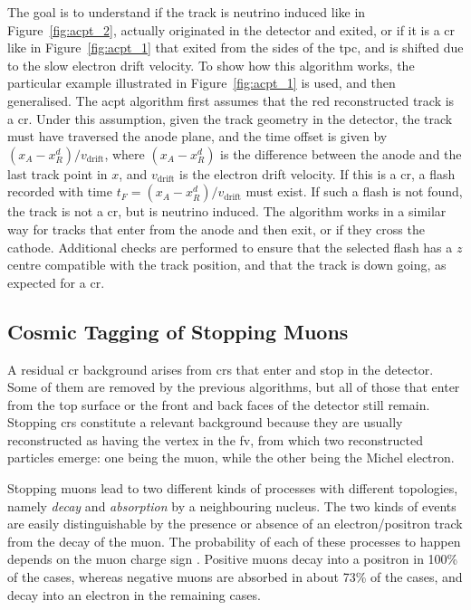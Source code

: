 The goal is to understand if the track is neutrino induced like in Figure~\ref{fig:acpt_2}, actually originated in the detector and exited, or if it is a \acrshort{cr} like in Figure~\ref{fig:acpt_1} that exited from the sides of the \acrshort{tpc}, and is shifted due to the slow electron drift velocity. To show how this algorithm works, the particular example illustrated in Figure~\ref{fig:acpt_1} is used, and then generalised. The \acrshort{acpt} algorithm first assumes that the red reconstructed track is a \acrshort{cr}. Under this assumption, given the track geometry in the detector, the track must have traversed the anode plane, and the time offset is given by $(x_A - x_R^d)/v_\text{drift}$, where $(x_A - x_R^d)$ is the difference between the anode  and the last track point in $x$, and $v_\text{drift}$ is the electron drift velocity. If this is a \acrshort{cr}, a flash recorded with time $t_F = (x_A - x_R^d)/v_\text{drift}$ must exist. 
If such a flash is not found, the track is not a \acrshort{cr}, but is neutrino induced.
The algorithm works in a similar way for tracks that enter from the anode and then exit, or if they cross the cathode.
Additional checks are performed to ensure that the selected flash has a $z$ centre compatible with the track position, and that the track is down going, as expected for a \acrshort{cr}.  








\subsection[Cosmic Tagging: Stopping Muons]{Cosmic Tagging of Stopping Muons}
\label{sec:ct_stopmu}

A residual \acrshort{cr} background arises from \acrshort{cr}s that enter and stop in the detector. Some of them are removed by the previous algorithms,  but all of those that enter from the top surface or the front and back faces of the detector still remain.  
Stopping \acrshort{cr}s constitute a relevant background because they are usually reconstructed as having the vertex in the \acrshort{fv}, from which two reconstructed particles emerge: one being the muon, while the other being the Michel electron.

Stopping muons lead to two different kinds of processes with different topologies, namely \emph{decay} and \emph{absorption} by a neighbouring nucleus. The two kinds of events are easily distinguishable by the presence or absence of an electron/positron track from the decay of the muon. The probability of each of these processes to happen depends on the muon charge sign \cite{muon_capture_1, muon_capture_2, muon_capture_3}. Positive muons decay into a positron in 100\% of the cases, whereas negative muons are absorbed in about 73\% of the cases, and decay into an electron in the remaining cases.

